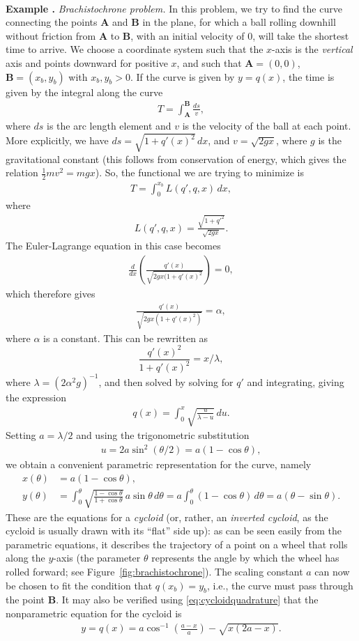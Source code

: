 \documentclass[12pt]{amsart}
\newcommand{\eq}[1]{\begin{equation}\begin{split}#1\end{split}\end{equation}}
\newcommand{\eqst}[1]{\begin{align*}#1\end{align*}}
\newcommand{\der}[2]{\frac{d#1}{d#2}}
\newcounter{example}
\newcommand{\beginexample}[1]{\ \\ \addtocounter{example}{1} \textbf{Example \arabic{example}.} \textit{#1.}}
\begin{document}
\beginexample{Brachistochrone problem} In this problem, we try to find the curve connecting the points $\mathbf{A}$ and $\mathbf{B}$ in the plane, for which a ball rolling downhill without friction from $\mathbf{A}$ to $\mathbf{B}$, with an initial velocity of $0$, will take the shortest time to arrive. We choose a coordinate system such that the $x$-axis is the \emph{vertical} axis and points downward for positive $x$, and such that $\mathbf{A}=(0,0)$, $\mathbf{B}=(x_b,y_b)$ with $x_b,y_b>0$. If the curve is given by $y=q(x)$, the time is given by the integral along the curve
\eqst{
T = \int_{\mathbf{A}}^{\mathbf{B}} \frac{ds}{v}, 
}
where $ds$ is the arc length element and $v$ is the velocity of the ball at each point. More explicitly, we have $ds = \sqrt{1+q'(x)^2}\,dx$, and $v=\sqrt{2g x}$, where $g$ is the gravitational constant (this follows from conservation of energy, which gives the relation $\tfrac12 m v^2 = mgx$). So, the functional we are trying to minimize is
\eqst{
T = \int_0^{x_b} L(q',q,x)\,dx, 
}
where
\eqst{
L(q',q,x) = \frac{\sqrt{1+q'^2}}{\sqrt{2g x}}. 
}
The Euler-Lagrange equation in this case becomes
\eqst{
\der{}{x}\left(\frac{q'(x)}{\sqrt{2 g x(1+q'(x)^2}}\right) = 0,
}
which therefore gives
\eqst{
\frac{q'(x)}{\sqrt{2 g x(1+q'(x)^2)}} = \alpha,
}
where $\alpha$ is a constant. This can be rewritten as
$$ \frac{q'(x)^2}{1+q'(x)^2} = x/\lambda, $$
where $\lambda=(2\alpha^2 g)^{-1}$, and then solved by solving for $q'$ and integrating, giving
the expression
\eq{ \label{eq:cycloidquadrature}
q(x) = \int_0^x \sqrt{\frac{u}{\lambda-u}}\,du.
}
Setting $a=\lambda/2$ and using the trigonometric substitution
\eqst{ u = 2a \sin^2(\theta/2) = a(1-\cos \theta), }
we obtain a convenient parametric representation for the curve, namely
\eqst{
x(\theta) &= a(1-\cos \theta), \\
y(\theta) &= \int_0^\theta \sqrt{\frac{1-\cos\theta}{1+\cos\theta}}\,a\sin \theta\,d\theta
= a\int_0^\theta (1-\cos\theta)\,d\theta = a(\theta-\sin\theta).
}
These are the equations for a \emph{cycloid} (or, rather, an \emph{inverted cycloid}, as the cycloid is usually drawn with its ``flat'' side up): as can be seen easily from the parametric equations, it describes the trajectory of a point on a wheel that rolls along the $y$-axis (the parameter $\theta$ represents the angle by which the wheel has rolled forward; see Figure~\ref{fig:brachistochrone}). The scaling constant $a$ can now be chosen to fit the condition that $q(x_b)=y_b$, i.e., the curve must pass through the point $\mathbf{B}$. It may also be verified using \eqref{eq:cycloidquadrature} that the nonparametric equation for the cycloid is
\eqst{
y = q(x) = a \cos^{-1}\left(\frac{a-x}{a}\right)-\sqrt{x(2a-x)}.
}
\end{document}
